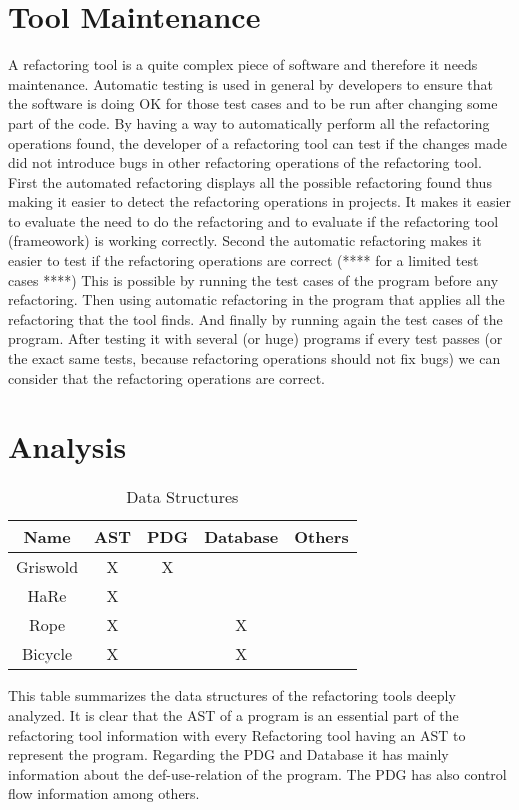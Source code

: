 \section{Tool Maintenance}

A refactoring tool is a quite complex piece of software and therefore it needs maintenance.
Automatic testing is used in general by developers to ensure that the software
is doing OK for those test cases and to be run after changing some part of the code.
By having a way to automatically perform all the refactoring operations found,
the developer of a refactoring tool can test if the changes made did not introduce
bugs in other refactoring operations of the refactoring tool. %
First the automated refactoring displays all the possible refactoring found thus making it easier
to detect the refactoring operations in projects.
It makes it easier to evaluate the need to do the refactoring and to evaluate
if the refactoring tool (frameowork) is working correctly.
Second the automatic refactoring makes it easier to test if the refactoring operations are correct (**** for a limited test cases ****)
This is possible by running the test cases of the program before any refactoring.
Then using automatic refactoring in the program that applies all the refactoring that the tool finds.
And finally by running again the test cases of the program.
After testing it with several (or huge) programs if every test passes (or the exact same tests, because refactoring operations should not fix bugs)
we can consider that the refactoring operations are correct.


\section{Analysis}
\begin{table}[]
\centering
\caption{Data Structures}
\label{my-label}
\begin{tabular}{c|c|c|c|c}
Name     & AST & PDG & Database & Others \\ \hline
Griswold & X   & X   &          &        \\ \hline
HaRe     & X   &     &          &        \\ \hline
Rope     & X   &     & X        &        \\ \hline
Bicycle  & X   &     & X        &
\end{tabular}
\end{table}
This table summarizes the data structures of the refactoring tools deeply analyzed.
It is clear that the AST of a program is an essential part of the refactoring
tool information with every Refactoring tool having an AST to represent the program.
Regarding the PDG and Database it has mainly information about the def-use-relation
of the program. The PDG has also control flow information among others.

